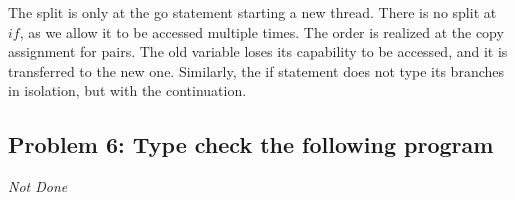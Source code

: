 The split is only at the go statement starting a new thread. 
There is no split at $if$, as we allow it to be accessed multiple times. 
The order is realized at the copy assignment for pairs. 
The old variable loses its capability to be accessed, and it is transferred to the new one. 
Similarly, the if statement does not type its branches in isolation, but with the continuation.

\subsection{Problem 6: Type check the following program}


\textit{Not Done}